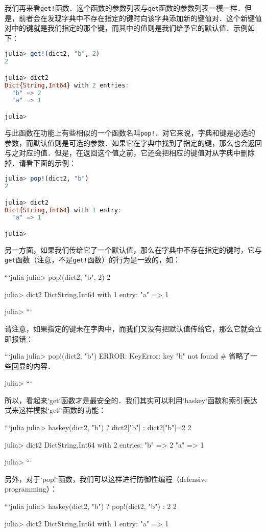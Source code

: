 我们再来看\verb|get!|函数．这个函数的参数列表与\verb|get|函数的参数列表一模一样．但是，前者会在发现字典中不存在指定的键时向该字典添加新的键值对．这个新键值对中的键就是我们指定的那个键，而其中的值则是我们给予它的默认值．示例如下：
\begin{lstlisting}[language=julia]
julia> get!(dict2, "b", 2)
2

julia> dict2
Dict{String,Int64} with 2 entries:
  "b" => 2
  "a" => 1

julia> 
\end{lstlisting}

与此函数在功能上有些相似的一个函数名叫\verb|pop!|．对它来说，字典和键是必选的参数，而默认值则是可选的参数．如果它在字典中找到了指定的键，那么也会返回与之对应的值．但是，在返回这个值之前，它还会把相应的键值对从字典中删除掉．请看下面的示例：
\begin{lstlisting}[language=julia]
julia> pop!(dict2, "b")
2

julia> dict2
Dict{String,Int64} with 1 entry:
  "a" => 1

julia> 
\end{lstlisting}

另一方面，如果我们传给它了一个默认值，那么在字典中不存在指定的键时，它与\verb|get|函数（注意，不是\verb|get!|函数）的行为是一致的，如：

```julia
julia> pop!(dict2, "b", 2)
2

julia> dict2
Dict{String,Int64} with 1 entry:
  "a" => 1

julia> 
```

请注意，如果指定的键未在字典中，而我们又没有把默认值传给它，那么它就会立即报错：

```julia
julia> pop!(dict2, "b")
ERROR: KeyError: key "b" not found
# 省略了一些回显的内容．

julia> 
```

所以，看起来`get`函数才是最安全的．我们其实可以利用`haskey`函数和索引表达式来这样模拟`get!`函数的功能：

```julia
julia> haskey(dict2, "b") ? dict2["b"] : dict2["b"]=2
2

julia> dict2
Dict{String,Int64} with 2 entries:
  "b" => 2
  "a" => 1

julia> 
```

另外，对于`pop!`函数，我们可以这样进行防御性编程（defensive programming）：

```julia
julia> haskey(dict2, "b") ? pop!(dict2, "b") : 2
2

julia> dict2
Dict{String,Int64} with 1 entry:
  "a" => 1

